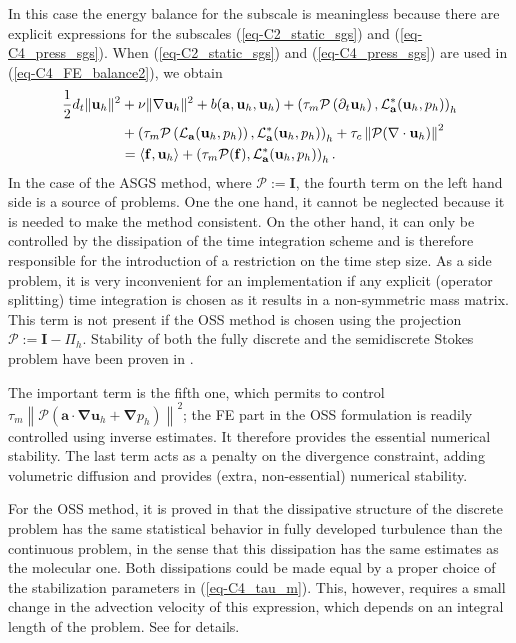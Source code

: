 In this case the energy balance for the subscale is meaningless because there are explicit expressions for the subscales (\ref{eq-C2_static_sgs}) and (\ref{eq-C4_press_sgs}). When (\ref{eq-C2_static_sgs}) and (\ref{eq-C4_press_sgs}) are used in (\ref{eq-C4_FE_balance2}), we obtain
\begin{align}
\label{eq-C4_static_energy}
\frac{1}{2}d_t\|{\bf u}_h\|^2
& +\nu\|\nabla{\bf u}_h\|^2 + b({\bf a},{\bf u}_h,{\bf u}_h)  
  + \left( \tau_{m} \mathcal{P} \left(  \partial_t {\bf u}_h \right), \mathcal{L}^*_{{\bf a}} ( {\bf u}_{h},p_h)\right)_h \\ \nonumber
& + \left(\tau_{m} \mathcal{P} \left( \mathcal{L}_{{\bf a}} ( {\bf u}_{h},p_h) \right),\mathcal{L}^*_{{\bf a}}({\bf u}_h,p_h)\right)_h
+ \tau_{c} \left\| \mathcal{P}(\nabla \cdot {\bf u}_{h})\right\|^{2}\\ \nonumber
& = \langle\mathbf{f},\mathbf{u}_h\rangle + \left(\tau_m \mathcal{P}(\mathbf{f}),\mathcal{L}^*_{{\bf a}}({\bf u}_h,p_h)\right)_h.
\end{align}
In the case of the ASGS method, where $\mathcal{P}:=\mathbf{I}$, the fourth term on the left hand side is a source of problems. One the one hand, it cannot be neglected because it is needed to make the method consistent. On the other hand, it can only be controlled by the dissipation of the time integration scheme and is therefore responsible for the introduction of a restriction on the time step size. As a side problem, it is very inconvenient for an implementation if any explicit (operator splitting) time integration is chosen as it results in a non-symmetric mass matrix. This term is not present if the OSS method is chosen using the projection $\mathcal{P}:=\mathbf{I}-\Pi_h$. Stability of both the fully discrete and the semidiscrete Stokes problem have been proven in \cite{badia_multiscale_2009}.

The important term is the fifth one, which permits to control
$ \tau_{m} \left\| \mathcal{P} \left( \mathbf{a}\cdot \mathbf{\nabla u}_{h}+\mathbf{\nabla }p_{h}\right) \right\|^{2} $; the FE part in the OSS formulation is readily controlled using inverse estimates. It therefore provides the essential numerical stability. The last term acts as a penalty on the divergence constraint, adding volumetric diffusion and provides (extra, non-essential) numerical stability.

For the OSS method, it is proved in \cite{guasch_statistical_2013} that the dissipative structure of the discrete problem has the same statistical behavior in fully developed turbulence than the continuous problem, in the sense that this dissipation has the same estimates as the molecular one. Both dissipations could be made equal by a proper choice of the stabilization parameters in (\ref{eq-C4_tau_m}). This, however, requires a small change in the advection velocity of this expression, which depends on an integral length of the problem. See \cite{guasch_statistical_2013} for details.

